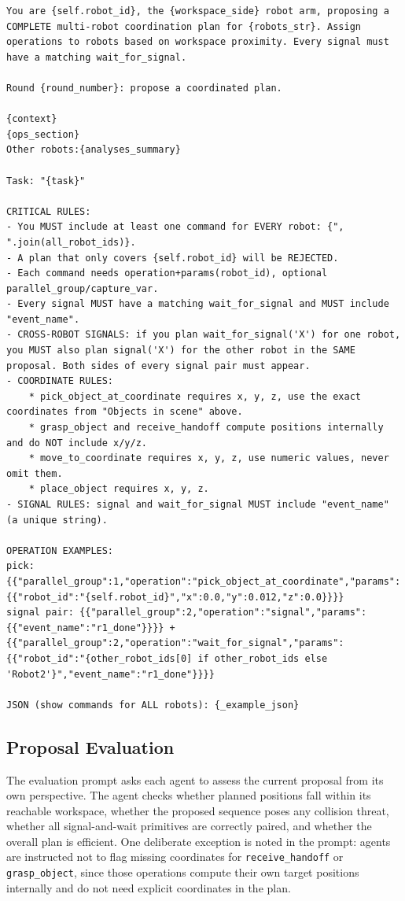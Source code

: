 \documentclass[
     12pt,
     a4paper,
     BCOR=10mm,
     DIV=14,
     listof=totoc,
     bibliography=totoc,
     parskip,
     twoside,
     headsepline
     ]{scrreprt}
\begin{document}
\begin{lstlisting}[caption={Plan proposal prompt for synthesizing multi-robot operation sequences with strict inclusion and synchronization constraints.}, extendedchars=true]
You are {self.robot_id}, the {workspace_side} robot arm, proposing a COMPLETE multi-robot coordination plan for {robots_str}. Assign operations to robots based on workspace proximity. Every signal must have a matching wait_for_signal.

Round {round_number}: propose a coordinated plan.

{context}
{ops_section}
Other robots:{analyses_summary}

Task: "{task}"

CRITICAL RULES:
- You MUST include at least one command for EVERY robot: {", ".join(all_robot_ids)}.
- A plan that only covers {self.robot_id} will be REJECTED.
- Each command needs operation+params(robot_id), optional parallel_group/capture_var.
- Every signal MUST have a matching wait_for_signal and MUST include "event_name".
- CROSS-ROBOT SIGNALS: if you plan wait_for_signal('X') for one robot, you MUST also plan signal('X') for the other robot in the SAME proposal. Both sides of every signal pair must appear.
- COORDINATE RULES:
    * pick_object_at_coordinate requires x, y, z, use the exact coordinates from "Objects in scene" above.
    * grasp_object and receive_handoff compute positions internally and do NOT include x/y/z.
    * move_to_coordinate requires x, y, z, use numeric values, never omit them.
    * place_object requires x, y, z.
- SIGNAL RULES: signal and wait_for_signal MUST include "event_name" (a unique string).

OPERATION EXAMPLES:
pick: {{"parallel_group":1,"operation":"pick_object_at_coordinate","params":{{"robot_id":"{self.robot_id}","x":0.0,"y":0.012,"z":0.0}}}}
signal pair: {{"parallel_group":2,"operation":"signal","params":{{"event_name":"r1_done"}}}} + {{"parallel_group":2,"operation":"wait_for_signal","params":{{"robot_id":"{other_robot_ids[0] if other_robot_ids else 'Robot2'}","event_name":"r1_done"}}}}

JSON (show commands for ALL robots): {_example_json}
\end{lstlisting}

\subsection{Proposal Evaluation}
The evaluation prompt asks each agent to assess the current proposal from its own perspective. The agent checks whether planned positions fall within its reachable workspace, whether the proposed sequence poses any collision threat, whether all signal-and-wait primitives are correctly paired, and whether the overall plan is efficient. One deliberate exception is noted in the prompt: agents are instructed not to flag missing coordinates for \texttt{receive\_handoff} or \texttt{grasp\_object}, since those operations compute their own target positions internally and do not need explicit coordinates in the plan.
\end{document}
